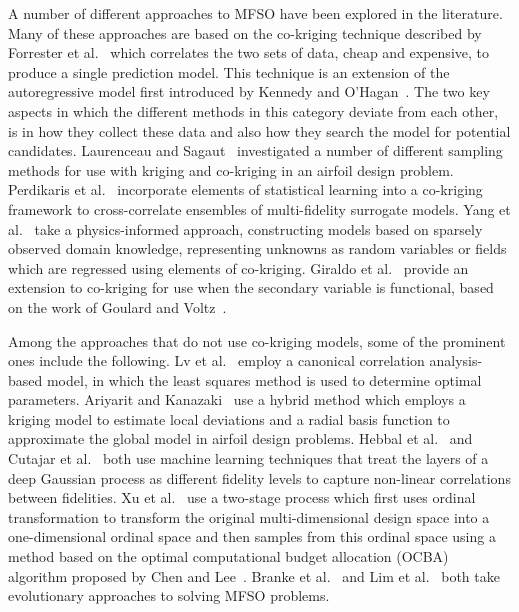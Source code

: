 A number of different approaches to MFSO have been explored in the literature. Many of these approaches are based on the co-kriging technique described by Forrester et al.~\cite{forrester2007multi} which correlates the two sets of data, cheap and expensive, to produce a single prediction model. This technique is an extension of the autoregressive model first introduced by Kennedy and O'Hagan~\cite{kennedy2000predicting}. The two key aspects in which the different methods in this category deviate from each other, is in how they collect these data and also how they search the model for potential candidates. Laurenceau and Sagaut~\cite{laurenceau2008building} investigated a number of different sampling methods for use with kriging and co-kriging in an airfoil design problem. Perdikaris et al.~\cite{perdikaris2015multi} incorporate elements of statistical learning into a co-kriging framework to cross-correlate ensembles of multi-fidelity surrogate models. Yang et al.~\cite{yang2019physics} take a physics-informed approach, constructing models based on sparsely observed domain knowledge, representing unknowns as random variables or fields which are regressed using elements of co-kriging. Giraldo et al.~\cite{giraldo2020cokriging} provide an extension to co-kriging for use when the secondary variable is functional, based on the work of Goulard and Voltz~\cite{goulard1993geostatistical}.

Among the approaches that do not use co-kriging models, some of the prominent ones include the following. Lv et al.~\cite{lv2021multi} employ a canonical correlation analysis-based model, in which the least squares method is used to determine optimal parameters.  Ariyarit and Kanazaki~\cite{ariyarit2017multi} use a hybrid method which employs a kriging model to estimate local deviations and a radial basis function to approximate the global model in airfoil design problems. Hebbal et al.~\cite{hebbal2021multi} and Cutajar et al.~\cite{cutajar2019deep} both use machine learning techniques that treat the layers of a deep Gaussian process as different fidelity levels to capture non-linear correlations between fidelities. Xu et al.~\cite{xu2016mo2tos} use a two-stage process which first uses ordinal transformation to transform the original multi-dimensional design space into a one-dimensional ordinal space and then samples from this ordinal space using a method based on the optimal computational budget allocation (OCBA) algorithm proposed by Chen and Lee~\cite{chen2011stochastic}. Branke et al.~\cite{branke2016efficient} and Lim et al.~\cite{lim2008evolutionary} both take evolutionary approaches to solving MFSO problems.

